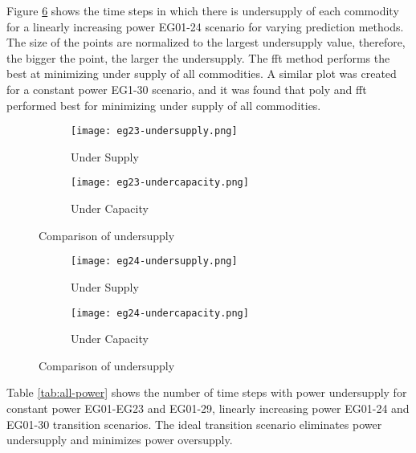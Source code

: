 Figure \ref{fig:eg24under} shows the time steps in which there is undersupply 
of each commodity for a linearly increasing power EG01-24 scenario for varying 
prediction methods.
The size of the points are normalized to the largest undersupply
value, therefore, the bigger the point, the larger the undersupply. 
The fft method performs the best at minimizing under supply of all 
commodities.
A similar plot was created for a constant power EG1-30 scenario, and 
it was found that poly and fft performed best for minimizing under supply 
of all commodities.  

\begin{figure}[]
	\centering
	\begin{subfigure}[t]{1.2\textwidth}
		\centering
		\texttt{[image: eg23-undersupply.png]} 
		\caption{Under Supply}
		\label{fig:23undersupply}
	\end{subfigure}
	\vspace{1cm}
	\begin{subfigure}[t]{1.2\textwidth}
		\centering
		\texttt{[image: eg23-undercapacity.png]} 
		\caption{Under Capacity}
		\label{fig:23undercapacity}
	\end{subfigure}
	\hfill
	\caption{Comparison of undersupply}
	\label{fig:eg23under}
\end{figure}

\begin{figure}[]
	\centering
	\begin{subfigure}[t]{1.2\textwidth}
		\centering
		\texttt{[image: eg24-undersupply.png]} 
		\caption{Under Supply}
		\label{fig:24undersupply}
	\end{subfigure}
	\vspace{1cm}
	\begin{subfigure}[t]{1.2\textwidth}
		\centering
		\texttt{[image: eg24-undercapacity.png]} 
		\caption{Under Capacity}
		\label{fig:24undercapacity}
	\end{subfigure}
	\hfill
	\caption{Comparison of undersupply}
	\label{fig:eg24under}
\end{figure}

Table \ref{tab:all-power} shows the number of time steps with power 
undersupply for constant power EG01-EG23 and EG01-29, 
linearly increasing power EG01-24 and EG01-30 transition scenarios. 
The ideal transition scenario eliminates power undersupply and 
minimizes power oversupply. 


